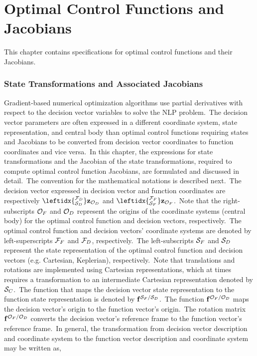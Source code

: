 
\chapter{Optimal Control Functions and Jacobians}

This chapter contains specifications for optimal control functions and their Jacobians.

\subsection{State Transformations and Associated Jacobians}
Gradient-based numerical optimization algorithms use partial derivatives with respect to the decision vector variables to solve the NLP problem.~The decision vector parameters are often expressed in a different coordinate system, state representation, and central body than optimal control functions requiring states and Jacobians to be converted from decision vector coordinates to function coordinates and vice versa.~In this chapter, the expressions for state transformations and the Jacobian of the state transformations, required to compute optimal control function Jacobians, are formulated and discussed in detail.~The convention for the mathematical notations is described next.~The decision vector expressed in decision vector and function coordinates are respectively $\leftidx{_{\mcS_D}^{\mcF_D}} \mbz_{\mcO_D}$ and $\leftidx{_{\mcS_F}^{\mcF_F}} \mbz_{\mcO_F} $.~Note that the right-subscripts $\mathcal{O}_F$ and $\mathcal{O}_D$ represent the origins of the coordinate systems (central body) for the optimal control function and decision vectors, respectively.~The optimal control function and decision vectors' coordinate systems are denoted by left-superscripts $\mathcal{F}_F$ and $\mathcal{F}_D$, respectively.~The left-subscripts $\mathcal{S}_F$ and $\mathcal{S}_D$ represent the state representation of the optimal control function and decision vectors (e.g. Cartesian, Keplerian), respectively.~Note that translations and rotations are implemented using Cartesian representations, which at times requires a transformation to an intermediate Cartesian representation denoted by $\mathcal{S}_C$.~The function that maps the decision vector state representation to the function state representation is denoted by $\mathbf{f}^{\mathcal{S}_F / \mathcal{S}_D}$.~The function $\mathbf{f}^{\mathcal{O}_F / \mathcal{O}_D}$ maps the decision vector's origin to the function vector's origin.~The rotation matrix $\mathbf{f}^{\mathcal{O}_F / \mathcal{O}_D}$ converts the decision vector's reference frame to the function vector's reference frame.~In general, the transformation from decision vector description and coordinate system to the function vector description and coordinate system may be written as,

